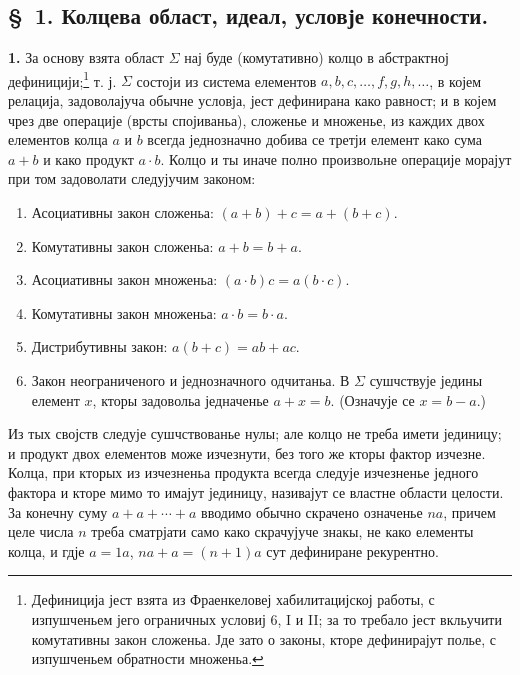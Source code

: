﻿\documentclass[11pt]{article}
\begin{document}

\setcounter{footnote}{5}
\subsection*{\S~1. Колцева област, идеал, условје конечности.}

\textbf{1.} За основу взята област \(\Sigma\) нај буде (комутативно) колцо в абстрактној дефиницији;\footnote{Дефиниција јест взята из Фраенкеловеј хабилитацијској работы, с изпушченьем јего ограничных условиј 6, I и II; за то требало јест вкльучити комутативны закон сложеньа. Јде зато о законы, кторе дефинирајут полье, с изпушченьем обратности множеньа.} т. ј. \(\Sigma\) состоји из система елементов \(a,b,c,\ldots,f,g,h,\ldots\), в којем релација, задоволајуча обычне условја, јест дефинирана како равност; и в којем чрез две операције (врсты спојиваньа), сложенье и множенье, из каждих двох елементов колца \(a\) и \(b\) всегда једнозначно добива се третји елемент како сума \(a+b\) и како продукт \(a\cdot b\). Колцо и ты иначе полно произвольне операције морајут при том задоволати следујучим законом:
\begin{enumerate}
\item Асоциативны закон сложеньа: \((a+b)+c=a+(b+c)\).
\item Комутативны закон сложеньа: \(a+b=b+a\).
\item Асоциативны закон множеньа: \((a\cdot b)c=a(b\cdot c)\).
\item Комутативны закон множеньа: \(a\cdot b=b\cdot a\).
\item Дистрибутивны закон: \(a(b+c)=ab+ac\).
\item Закон неограниченого и једнозначного одчитаньа. В \(\Sigma\) сушчствује једины елемент \(x\), кторы задовольа једначенье \(a+x=b\). (Означује се \(x=b-a\).)
\end{enumerate}
Из тых својств следује сушчствованье нулы; але колцо не треба имети јединицу; и продукт двох елементов може изчезнути, без того же кторы фактор изчезне. Колца, при кторых из изчезненьа продукта всегда следује изчезненье једного фактора и кторе мимо то имајут јединицу, називајут се властне области целости. За конечну суму \(a+a+\cdots+a\) вводимо обычно скрачено означенье \(na\), причем целе числа \(n\) треба сматрјати само како скрачујуче знакы, не како елементы колца, и гдје \(a=1a\), \(na+a=(n+1)a\) сут дефиниране рекурентно.
\end{document}
